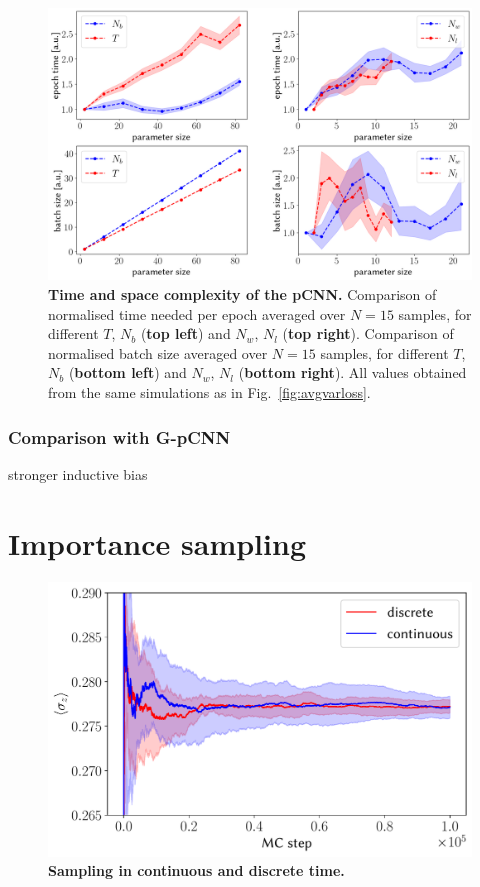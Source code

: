 \begin{figure}[H]
	\centering
	\includegraphics[width=\linewidth]{Chapter5/Figs/Raster/initial_time_space}
	\caption[Time and space complexity of the pCNN]{\textbf{Time and space complexity of the pCNN.} Comparison of normalised time needed per epoch averaged over $N=15$ samples, for different $T$, $N_b$ (\textbf{top left}) and $N_w$, $N_l$ (\textbf{top right}). Comparison of normalised batch size averaged over $N=15$ samples, for different $T$, $N_b$ (\textbf{bottom left}) and $N_w$, $N_l$ (\textbf{bottom right}). All values obtained from the same simulations as in Fig.~\ref{fig:avgvarloss}.}
	\label{fig:initialtimespace}
\end{figure}

\subsubsection{Comparison with G-pCNN}
stronger inductive bias


\section{Importance sampling}
\begin{figure}[H]
	\centering
	\includegraphics[width=0.65\linewidth]{Chapter5/Figs/Vector/sampling_example}
	\caption[Sampling in continuous and discrete time]{\textbf{Sampling in continuous and discrete time.}}
	\label{fig:samplingexample}
\end{figure}



